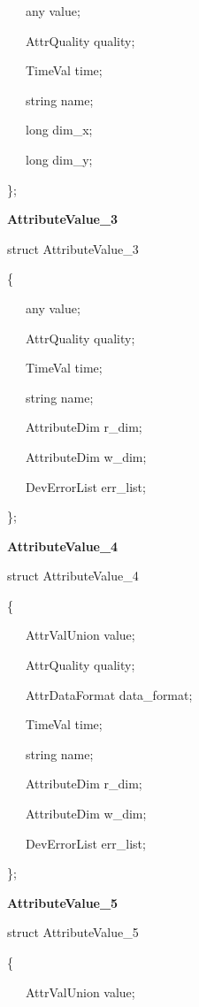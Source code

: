 ~~~any value;

~~~AttrQuality quality;

~~~TimeVal time;

~~~string name;

~~~long dim\_x;

~~~long dim\_y;

\};\\

\begin{flushleft}
\textbf{AttributeValue\_3}
\par\end{flushleft}

struct AttributeValue\_3

\{

~~~any value;

~~~AttrQuality quality;

~~~TimeVal time;

~~~string name;

~~~AttributeDim r\_dim;

~~~AttributeDim w\_dim;

~~~DevErrorList err\_list;

\};\\

\begin{flushleft}
\textbf{AttributeValue\_4}
\par\end{flushleft}

struct AttributeValue\_4

\{

~~~AttrValUnion value;

~~~AttrQuality quality;

~~~AttrDataFormat data\_format;

~~~TimeVal time;

~~~string name;

~~~AttributeDim r\_dim;

~~~AttributeDim w\_dim;

~~~DevErrorList err\_list;

\};\\

\begin{flushleft}
\textbf{AttributeValue\_5}
\par\end{flushleft}

struct AttributeValue\_5

\{

~~~AttrValUnion value;

